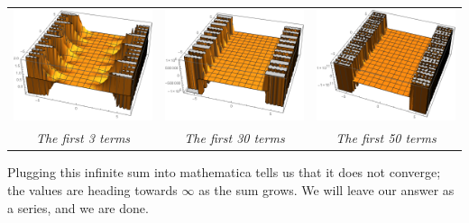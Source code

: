 \documentclass{article}
\begin{document}
\begin{center}
\begin{tabular}{c c c}
\includegraphics[scale=0.3]{lap_01_3} & \includegraphics[scale=0.3]{lap_01_30} & \includegraphics[scale=0.3]{lap_01_50}\\
\textit{The first 3 terms} & \textit{The first 30 terms} & \textit{The first 50 terms}
\end{tabular}
\end{center}
Plugging this infinite sum into mathematica tells us that it does not converge; the values are heading towards $\infty$ as the sum grows. We will leave our answer as a series, and we are done.
\end{document}
